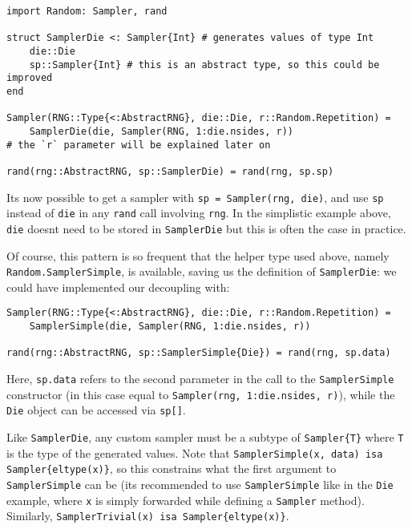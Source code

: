 \begin{verbatim}
import Random: Sampler, rand

struct SamplerDie <: Sampler{Int} # generates values of type Int
    die::Die
    sp::Sampler{Int} # this is an abstract type, so this could be improved
end

Sampler(RNG::Type{<:AbstractRNG}, die::Die, r::Random.Repetition) =
    SamplerDie(die, Sampler(RNG, 1:die.nsides, r))
# the `r` parameter will be explained later on

rand(rng::AbstractRNG, sp::SamplerDie) = rand(rng, sp.sp)
\end{verbatim}



It{\textquotesingle}s now possible to get a sampler with \texttt{sp = Sampler(rng, die)}, and use \texttt{sp} instead of \texttt{die} in any \texttt{rand} call involving \texttt{rng}. In the simplistic example above, \texttt{die} doesn{\textquotesingle}t need to be stored in \texttt{SamplerDie} but this is often the case in practice.



Of course, this pattern is so frequent that the helper type used above, namely \texttt{Random.SamplerSimple}, is available, saving us the definition of \texttt{SamplerDie}: we could have implemented our decoupling with:




\begin{verbatim}
Sampler(RNG::Type{<:AbstractRNG}, die::Die, r::Random.Repetition) =
    SamplerSimple(die, Sampler(RNG, 1:die.nsides, r))

rand(rng::AbstractRNG, sp::SamplerSimple{Die}) = rand(rng, sp.data)
\end{verbatim}



Here, \texttt{sp.data} refers to the second parameter in the call to the \texttt{SamplerSimple} constructor (in this case equal to \texttt{Sampler(rng, 1:die.nsides, r)}), while the \texttt{Die} object can be accessed via \texttt{sp[]}.



Like \texttt{SamplerDie}, any custom sampler must be a subtype of \texttt{Sampler\{T\}} where \texttt{T} is the type of the generated values. Note that \texttt{SamplerSimple(x, data) isa Sampler\{eltype(x)\}}, so this constrains what the first argument to \texttt{SamplerSimple} can be (it{\textquotesingle}s recommended to use \texttt{SamplerSimple} like in the \texttt{Die} example, where \texttt{x} is simply forwarded while defining a \texttt{Sampler} method). Similarly, \texttt{SamplerTrivial(x) isa Sampler\{eltype(x)\}}.



